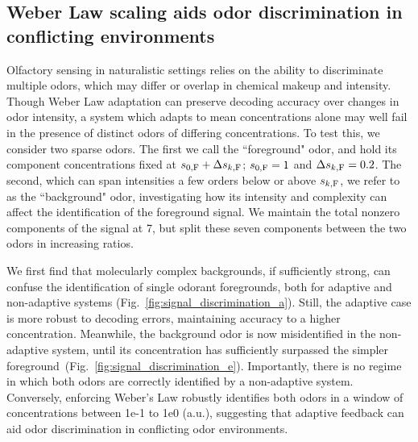 


\subsection{Weber Law scaling aids odor discrimination in conflicting environments}


Olfactory sensing in naturalistic settings relies on the ability to discriminate multiple odors, which may differ or overlap in chemical makeup and intensity. Though Weber Law adaptation can preserve decoding accuracy over changes in odor intensity, a system which adapts to mean concentrations alone may well fail in the presence of distinct odors of differing concentrations. To test this, we consider two sparse odors. The first we call the ``foreground" odor, and hold its component concentrations fixed at $s_{0, \text F} + \Delta s_{k, \text F}$; $s_{0, \text F} = 1$ and $\Delta s_{k, \text F} = 0.2$. The second, which can span intensities a few orders below or above $s_{k, \text F}$, we refer to as the ``background" odor, investigating how its intensity and complexity can affect the identification of the foreground signal. We maintain the total nonzero components of the signal at 7, but split these seven components between the two odors in increasing ratios. 

We first find that molecularly complex backgrounds, if sufficiently strong, can confuse the identification of single odorant foregrounds, both for adaptive and non-adaptive systems (Fig.~\ref{fig:signal_discrimination_a}). Still, the adaptive case is more robust to decoding errors, maintaining accuracy to a higher concentration. Meanwhile, the background odor is now misidentified in the non-adaptive system, until its concentration has sufficiently surpassed the simpler foreground~(Fig.~\ref{fig:signal_discrimination_e}). Importantly, there is no regime in which both odors are correctly identified by a non-adaptive system. Conversely, enforcing Weber's Law robustly identifies both odors in a window of concentrations between 1e-1 to 1e0 (a.u.), suggesting that adaptive feedback can aid odor discrimination in conflicting odor environments.

